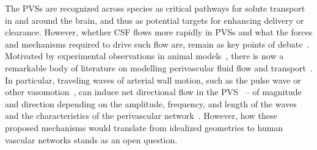 \documentclass[fleqn,10pt]{wlscirep}
\begin{document}
The PVSs are recognized across species as critical pathways for solute
transport in and around the brain, and thus as potential targets for
enhancing delivery or clearance. However, whether CSF flows more
rapidly in PVSs and what the forces and mechanisms required to drive
such flow are, remain as key points of
debate~\cite{bohr2022glymphatic, van2024caa,
  kipnis2025resolving}. Motivated by experimental observations in
animal models~\cite{iliff2012paravascular, iliff2013cerebral,
  mestre2018flow, bedussi2018paravascular}, there is now a remarkable
body of literature on modelling perivascular fluid flow and
transport~\cite{bilston2003arterial, asgari2016glymphatic,
  rey2018pulsatile, daversin2020mechanisms, sharp2019dispersion,
  thomas2019fluid, kedarasetti2020functional, kedarasetti2020arterial,
  troyetsky2021dispersion, martinac2021phase, gjerde2023directional,
  nozaleda2024arterial}. In particular, traveling waves of arterial
wall motion, such as the pulse wave or other
vasomotion~\cite{vanveluw2020vasomotion, munting2023spontaneous,
  bojarskaite2023sleep, broggini2024long,hauglund2025norepinephrine},
can induce net directional flow in the
PVS~\cite{kedarasetti2020arterial, kedarasetti2020functional,
  coenen2021lubrication, gjerde2023directional, nozaleda2024arterial}
-- of magnitude and direction depending on the amplitude, frequency,
and length of the waves and the characteristics of the perivascular
network~\cite{gjerde2023directional}. However, how these proposed
mechanisms would translate from idealized geometries to human vascular
networks stands as an open question. 
\end{document}
